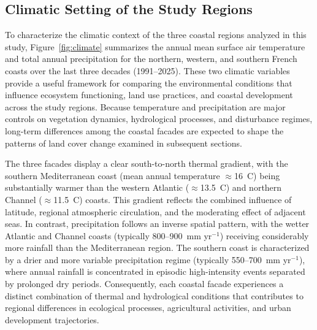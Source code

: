 \documentclass[coasts,article,accept,pdftex,moreauthors]{Definitions/mdpi}
\begin{document}
\subsection{{Climatic Setting of the Study Regions}}

{To characterize the climatic context of the three coastal regions analyzed in this study, Figure~\ref{fig:climate} summarizes the annual mean surface air temperature and total annual precipitation for the northern, western, and southern French coasts over the last three decades (1991--2025). These two climatic variables provide a useful framework for comparing the environmental conditions that influence ecosystem functioning, land use practices, and coastal development across the study regions. Because temperature and precipitation are major controls on vegetation dynamics, hydrological processes, and disturbance regimes, long-term differences among the coastal facades are expected to shape the patterns of land cover change examined in subsequent sections.}



{The three facades display a clear south-to-north thermal gradient, with the southern Mediterranean coast (mean annual temperature $\approx$16~\degree C) being substantially warmer than the western Atlantic ($\approx$13.5~\degree C) and northern Channel ($\approx$11.5~\degree C) coasts. This gradient reflects the combined influence of latitude, regional atmospheric circulation, and the moderating effect of adjacent seas. In contrast, precipitation follows an inverse spatial pattern, with the wetter Atlantic and Channel coasts (typically 800--900~mm yr$^{-1}$) receiving considerably more rainfall than the Mediterranean region. The southern coast is characterized by a drier and more variable precipitation regime (typically 550--700~mm yr$^{-1}$), where annual rainfall is concentrated in episodic high-intensity events separated by prolonged dry periods. Consequently, each coastal facade experiences a distinct combination of thermal and hydrological conditions that contributes to regional differences in ecological processes, agricultural activities, and urban development trajectories.}
\end{document}
